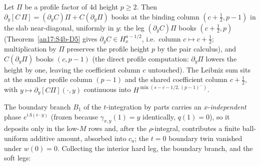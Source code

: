 \begin{proposition}\label{an17:S4b-profile}
Let $\Pi$ be a profile factor of $4$d height $p\ge2$. Then $\partial_y[C\,\Pi]=
(\partial_yC)\Pi+C(\partial_y\Pi)$ books at the binding column
$(c+\tfrac12,p-1)$ in the slab near-diagonal, uniformly in $y$: the leg
$(\partial_yC)\Pi$ books $(c+\tfrac12,p)$ (Theorem~\ref{an17:S4b-D5} gives
$\partial_yC\in H^{a-1/2}_x$, i.e.\ column $c\mapsto c+\tfrac12$; multiplication
by $\Pi$ preserves the profile height $p$ by the pair calculus), and
$C(\partial_y\Pi)$ books $(c,p-1)$ (the direct profile computation:
$\partial_y\Pi$ lowers the height by one, leaving the coefficient column $c$
untouched). The Leibniz sum sits at the smaller profile column $(p-1)$ and the
shared coefficient column $c+\tfrac12$, with $y\mapsto\partial_y[C\Pi](\cdot,y)$
continuous into $H^{\min(s-c-1/2,(p-1)^-)}$.
\end{proposition}

The boundary branch $B_1$ of the $t$-integration by parts carries an
$x$-\emph{independent} phase $e^{i\Lambda(e\cdot y)}$ (frozen because
$\gamma_{x,y}(1)=y$ identically, $q(1)=0$), so it deposits only in the low-$M$
rows and, after the $\rho$-integral, contributes a finite ball-uniform additive
amount, absorbed into $c_a$; the $t=0$ boundary twin vanished under $w(0)=0$.
Collecting the interior hard leg, the boundary branch, and the soft legs:

